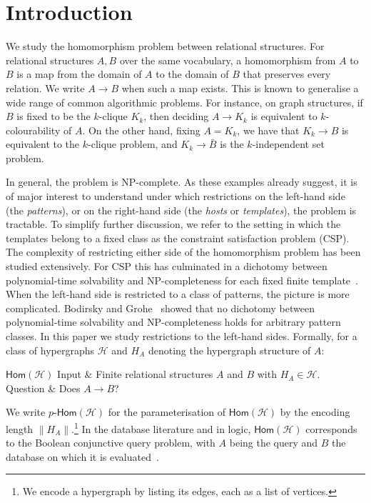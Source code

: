 \documentclass[11pt,letterpaper]{article}
\theoremstyle{definition}
\theoremstyle{remark}
\newcommand{\cH}{\mathcal H}
\newcommand{\Hom}{\mathsf{Hom}}
\newcommand{\pHom}{p\text{-}\mathsf{Hom}}
\begin{document}
%
\section{Introduction}
\label{sec:introduction}


We study the homomorphism problem between relational structures. For relational structures $A,B$ over the same vocabulary, a homomorphism from $A$ to $B$ is a map from the domain of $A$ to the domain of $B$ that preserves every relation. We write $A \to B$ when such a map exists.
This is known to generalise a wide range of common algorithmic problems. For instance, on graph structures, if $B$ is fixed to be the $k$-clique $K_k$, then deciding $A \to K_k$ is equivalent to $k$-colourability of $A$. On the other hand, fixing $A=K_k$, we have that $K_k \to B$ is equivalent to the $k$-clique problem, and $K_k \to \bar B$ is the $k$-independent set problem.


In general, the problem is NP-complete. As these examples already suggest, it is of major interest to understand under which restrictions on the left-hand side (the \emph{patterns}), or on the right-hand side (the \emph{hosts} or \emph{templates}), the problem is tractable. To simplify further discussion, we refer to the setting in which the templates belong to a fixed class as the constraint satisfaction problem (CSP).
The complexity of restricting either side of the homomorphism problem has been studied extensively. For CSP this has culminated in a dichotomy between polynomial-time solvability and NP-completeness for each fixed finite template~\cite{Bulatov2017,Zhuk2020}.
When the left-hand side is restricted to a class of patterns, the picture is more complicated. Bodirsky and Grohe~\cite{BodirskyGrohe2008} showed that no dichotomy between polynomial-time solvability and NP-completeness holds for arbitrary pattern classes. In this paper we study restrictions to the left-hand sides. Formally, for a class of hypergraphs $\cH$ and $H_A$ denoting the hypergraph structure of $A$:
%
\begin{problem}{$\Hom(\cH)$}
Input & Finite relational structures $A$ and $B$
with $H_A\in\cH$.\\
Question & Does $A\to B$?
\end{problem}

We write $\pHom(\cH)$ for the parameterisation of $\Hom(\cH)$ by the
encoding length $\lVert H_A\rVert$.\footnote{We encode a hypergraph by listing its edges, each as a list of vertices.} In the database literature and in logic, $\Hom(\cH)$ corresponds to
the Boolean conjunctive query problem, with $A$ being the query and $B$ the
database on which it is evaluated~\cite{ChandraMerlin77}.
\end{document}
